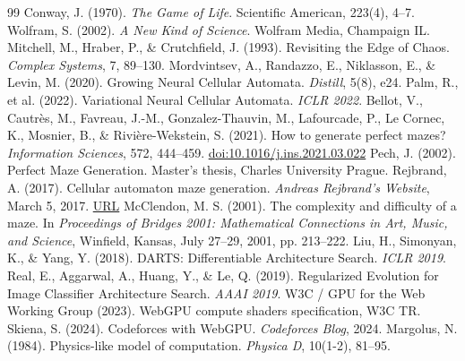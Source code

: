 \begin{thebibliography}{99}
\small
{} Conway, J. (1970). \textit{The Game of Life}. Scientific American, 223(4), 4--7.
 Wolfram, S. (2002). \textit{A New Kind of Science}. Wolfram Media, Champaign IL.
 Mitchell, M., Hraber, P., \& Crutchfield, J. (1993). Revisiting the Edge of Chaos. \textit{Complex Systems}, 7, 89--130.
 Mordvintsev, A., Randazzo, E., Niklasson, E., \& Levin, M. (2020). Growing Neural Cellular Automata. \textit{Distill}, 5(8), e24.
 Palm, R., et al. (2022). Variational Neural Cellular Automata. \textit{ICLR 2022}.
 Bellot, V., Cautrès, M., Favreau, J.-M., Gonzalez-Thauvin, M., Lafourcade, P., Le Cornec, K., Mosnier, B., \& Rivière-Wekstein, S. (2021). How to generate perfect mazes? \textit{Information Sciences}, 572, 444--459. \href{https://doi.org/10.1016/j.ins.2021.03.022}{doi:10.1016/j.ins.2021.03.022}
 Pech, J. (2002). Perfect Maze Generation. Master's thesis, Charles University Prague.
 Rejbrand, A. (2017). Cellular automaton maze generation. \textit{Andreas Rejbrand's Website}, March 5, 2017. \href{https://english.rejbrand.se/rejbrand/article.asp?ItemIndex=421}{URL}
 McClendon, M. S. (2001). The complexity and difficulty of a maze. In \textit{Proceedings of Bridges 2001: Mathematical Connections in Art, Music, and Science}, Winfield, Kansas, July 27--29, 2001, pp. 213--222.
 Liu, H., Simonyan, K., \& Yang, Y. (2018). DARTS: Differentiable Architecture Search. \textit{ICLR 2019}.
 Real, E., Aggarwal, A., Huang, Y., \& Le, Q. (2019). Regularized Evolution for Image Classifier Architecture Search. \textit{AAAI 2019}.
 W3C / GPU for the Web Working Group (2023). WebGPU compute shaders specification, W3C TR.
 Skiena, S. (2024). Codeforces with WebGPU. \textit{Codeforces Blog}, 2024.
 Margolus, N. (1984). Physics-like model of computation. \textit{Physica D}, 10(1-2), 81--95.
\end{thebibliography}
